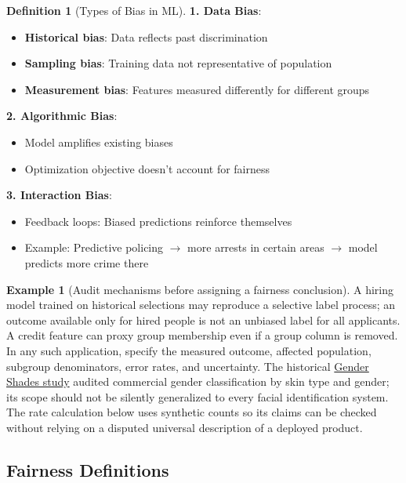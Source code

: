 \documentclass[11pt,twoside]{article}
\numberwithin{equation}{section}
\theoremstyle{plain}
\theoremstyle{definition}
\newtheorem{definition}[theorem]{Definition}
\newtheorem{example}[theorem]{Example}
\theoremstyle{remark}
\begin{document}
\begin{definition}[Types of Bias in ML]

\textbf{1. Data Bias}:
\begin{itemize}
\item \textbf{Historical bias}: Data reflects past discrimination
\item \textbf{Sampling bias}: Training data not representative of population
\item \textbf{Measurement bias}: Features measured differently for different groups
\end{itemize}

\textbf{2. Algorithmic Bias}:
\begin{itemize}
\item Model amplifies existing biases
\item Optimization objective doesn't account for fairness
\end{itemize}

\textbf{3. Interaction Bias}:
\begin{itemize}
\item Feedback loops: Biased predictions reinforce themselves
\item Example: Predictive policing $\to$ more arrests in certain areas $\to$ model predicts more crime there
\end{itemize}
\end{definition}

\begin{example}[Audit mechanisms before assigning a fairness conclusion]
A hiring model trained on historical selections may reproduce a selective
label process; an outcome available only for hired people is not an unbiased
label for all applicants. A credit feature can proxy group membership even if
a group column is removed. In any such application, specify the measured
outcome, affected population, subgroup denominators, error rates, and uncertainty.
The historical \href{https://proceedings.mlr.press/v81/buolamwini18a.html}{Gender Shades study}
audited commercial gender classification by skin type and gender; its scope
should not be silently generalized to every facial identification system.
The rate calculation below uses synthetic counts so its claims can be checked
without relying on a disputed universal description of a deployed product.
\end{example}

\subsection{Fairness Definitions}
\end{document}
